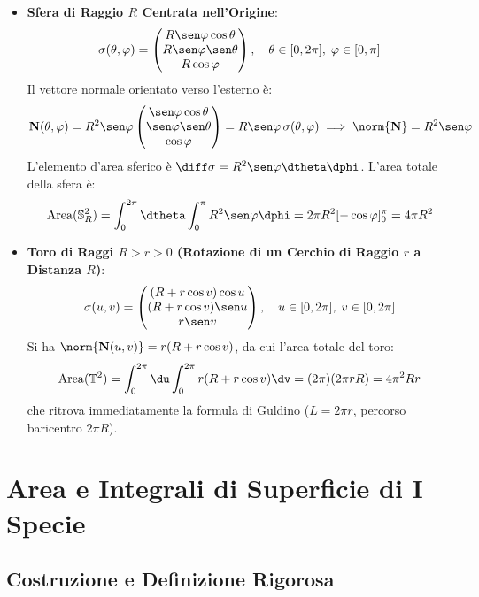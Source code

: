 \begin{metodo}
\begin{itemize}
    \item \textbf{Sfera di Raggio $R$ Centrata nell'Origine}:
    \[
    \sigma(\theta, \varphi) = \begin{pmatrix} R \sen\varphi \cos\theta \\ R \sen\varphi \sen\theta \\ R \cos\varphi \end{pmatrix}, \quad \theta \in [0, 2\pi], \; \varphi \in [0, \pi]
    \]
    Il vettore normale orientato verso l'esterno è:
    \[
    \mathbf{N}(\theta, \varphi) = R^2 \sen\varphi \begin{pmatrix} \sen\varphi \cos\theta \\ \sen\varphi \sen\theta \\ \cos\varphi \end{pmatrix} = R \sen\varphi \, \sigma(\theta, \varphi) \implies \norm{\mathbf{N}} = R^2 \sen\varphi
    \]
    L'elemento d'area sferico è $\diff\sigma = R^2 \sen\varphi \dtheta \dphi$. L'area totale della sfera è:
    \[
    \operatorname{Area}(\mathbb{S}_R^2) = \int_0^{2\pi} \dtheta \int_0^\pi R^2 \sen\varphi \dphi = 2\pi R^2 [-\cos\varphi]_0^\pi = 4\pi R^2
    \]

    \item \textbf{Toro di Raggi $R > r > 0$ (Rotazione di un Cerchio di Raggio $r$ a Distanza $R$)}:
    \[
    \sigma(u, v) = \begin{pmatrix} (R + r \cos v) \cos u \\ (R + r \cos v) \sen u \\ r \sen v \end{pmatrix}, \quad u \in [0, 2\pi], \; v \in [0, 2\pi]
    \]
    Si ha $\norm{\mathbf{N}(u,v)} = r(R + r \cos v)$, da cui l'area totale del toro:
    \[
    \operatorname{Area}(\mathbb{T}^2) = \int_0^{2\pi} \du \int_0^{2\pi} r(R + r\cos v) \dv = (2\pi)(2\pi r R) = 4\pi^2 R r
    \]
    che ritrova immediatamente la formula di Guldino ($L = 2\pi r$, percorso baricentro $2\pi R$).
\end{itemize}
\end{metodo}

\section{Area e Integrali di Superficie di I Specie}

\subsection{Costruzione e Definizione Rigorosa}

